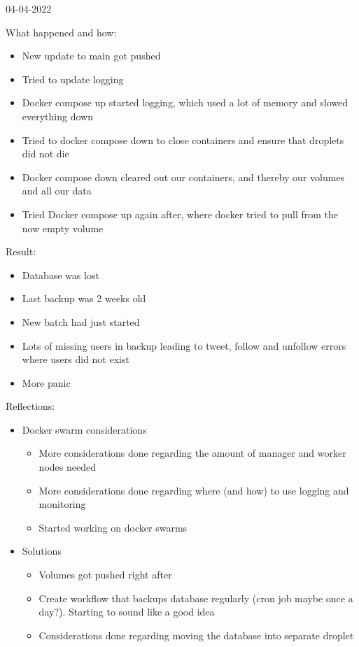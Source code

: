 \begin{enumerate}
    04-04-2022

    What happened and how:
    \begin{itemize}
        \item New update to main got pushed
        \item Tried to update logging
        \item Docker compose up started logging, which used a lot of memory and slowed everything down
        \item Tried to docker compose down to close containers and ensure that droplets did not die
        \item Docker compose down cleared out our containers, and thereby our volumes and all our data
        \item Tried Docker compose up again after, where docker tried to pull from the now empty volume
    \end{itemize}
    
    Result:
    \begin{itemize}
        \item Database was lost
        \item Last backup was 2 weeks old
        \item New batch had just started
        \item Lots of missing users in backup leading to tweet, follow and unfollow errors where users did not exist
        \item More panic
    \end{itemize}
    
    Reflections:
    \begin{itemize}
        \item Docker swarm considerations
        \begin{itemize}
            \item More considerations done regarding the amount of manager and worker nodes needed
            \item More considerations done regarding where (and how) to use logging and monitoring
            \item Started working on docker swarms
        \end{itemize}
        \item Solutions
        \begin{itemize}
            \item Volumes got pushed right after
            \item Create workflow that backups database regularly (cron job maybe once a day?). Starting to sound like a good idea
            \item Considerations done regarding moving the database into separate droplet
        \end{itemize}
    \end{itemize}
\end{enumerate}
